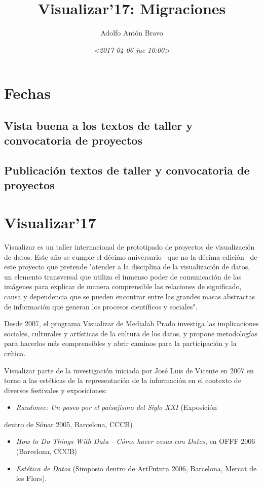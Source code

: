 \documentclass[11pt]{article}
\author{Adolfo Antón Bravo}
\date{\textit{<2017-04-06 jue 10:00>}}
\title{Visualizar'17: Migraciones}
\begin{document}
\maketitle

\section*{Fechas}
\label{sec-1}

\subsection*{Vista buena a los textos de taller y convocatoria de proyectos}
\label{sec-1-1}
\subsection*{Publicación textos de taller y convocatoria de proyectos}
\label{sec-1-2}

\section*{Visualizar'17}
\label{sec-2}

Visualizar es un taller internacional de prototipado de proyectos de visualización de datos. Este año se cumple el décimo aniversario --que no la décima edición-- de este proyecto que pretende "atender a la disciplina de la visualización de datos, un elemento transversal que utiliza el inmenso poder de comunicación de las imágenes para explicar de manera comprensible las relaciones de significado, causa y dependencia que se pueden encontrar entre las grandes masas abstractas de información que generan los procesos científicos y sociales".

Desde 2007, el programa Visualizar de Medialab Prado investiga las implicaciones sociales, culturales y artísticas de la cultura de los datos, y propone metodologías para hacerlos más comprensibles y abrir
caminos para la participación y la crítica. 

Visualizar parte de la investigación iniciada por José Luis de Vicente en 2007 en torno a las estéticas de la representación de la información en el contexto de diversos festivales y exposiciones:
\begin{itemize}
\item \emph{Randonee: Un paseo por el paisajismo del Siglo XXI} (Exposición
\end{itemize}
dentro de Sónar 2005, Barcelona, CCCB)
\begin{itemize}
\item \emph{How to Do Things With Data - Cómo hacer cosas con Datos}, en OFFF 2006 (Barcelona, CCCB)
\item \emph{Estética de Datos} (Simposio dentro de ArtFutura 2006, Barcelona, Mercat de les Flors).
\end{itemize}
\end{document}
